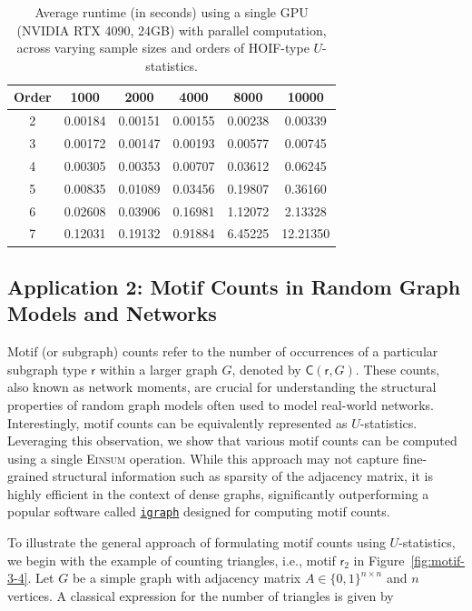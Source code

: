 \documentclass[twoside,11pt]{article}
\def\sfr{\mathsf{r}}
\def\Einsum{\textsc{Einsum}}
\newcommand{\libref}[2]{\href{#2}{\texttt{#1}}}
\newcommand{\motifrg}[2]{\mathsf{C}(#1,#2)}
\def\igraph{\libref{igraph}{https://igraph.org/}}
\begin{document}
\begin{table}[ht]
\centering
\caption{Average runtime (in seconds) using a single GPU (NVIDIA RTX 4090, 24GB) with parallel computation, across varying sample sizes and orders of HOIF-type $U$-statistics.}
\label{tab:HOIF_GPU}
\begin{tabular}{cccccc}
\toprule
\textbf{Order} & \textbf{1000} & \textbf{2000} & \textbf{4000} & \textbf{8000} & \textbf{10000} \\
\midrule
2 & 0.00184 & 0.00151 & 0.00155 & 0.00238 & 0.00339 \\
3 & 0.00172 & 0.00147 & 0.00193 & 0.00577 & 0.00745 \\
4 & 0.00305 & 0.00353 & 0.00707 & 0.03612 & 0.06245 \\
5 & 0.00835 & 0.01089 & 0.03456 & 0.19807 & 0.36160 \\
6 & 0.02608 & 0.03906 & 0.16981 & 1.12072 & 2.13328 \\
7 & 0.12031 & 0.19132 & 0.91884 & 6.45225 & 12.21350 \\
\bottomrule
\end{tabular}
\end{table}

\subsection{Application 2: Motif Counts in Random Graph Models and Networks}
\label{sec:example_motif}

Motif (or subgraph) counts refer to the number of occurrences of a particular subgraph type $\sfr$ within a larger graph $G$, denoted by $\motifrg{\sfr}{G}$. These counts, also known as network moments, are crucial for understanding the structural properties of random graph models often used to model real-world networks. %
Interestingly, motif counts can be equivalently represented as $U$-statistics. Leveraging this observation, we show that various motif counts can be computed using a single \Einsum{} operation. While this approach may not capture fine-grained structural information such as sparsity of the adjacency matrix, it is highly efficient in the context of dense graphs, significantly outperforming a popular software called \igraph{} designed for computing motif counts.

\iffalse
To illustrate the general approach of formulating motif counts using $U$-statistics, we begin with the example of counting triangles, i.e., motif $\sfr_2$ in Figure~\ref{fig:motif-3-4}. Let $G$ be a simple graph with adjacency matrix $A \in \{0,1\}^{n \times n}$ and $n$ vertices. A classical expression for the number of triangles is given by
\end{document}

